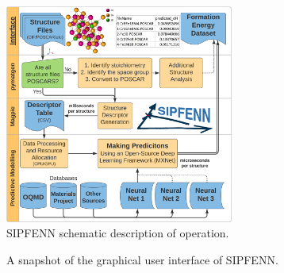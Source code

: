 \begin{figure}[H]
    \centering
    \includegraphics[width=0.67\textwidth]{sipfenn/SIPFENN_GraphicalAbstract_noPerformance.png}
    \caption{SIPFENN schematic description of operation.}
    \vspace{-12pt}
    \label{sipfenn:fig:sipfenn}
\end{figure}

\begin{figure}
    \centering
    \vspace{-12pt}
    \caption{A snapshot of the graphical user interface of SIPFENN.}
    \label{sipfenn:fig:sipfennGUI}
    \vspace{-24pt}
\end{figure}

